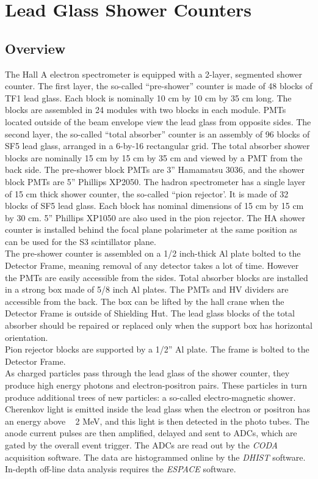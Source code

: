 \documentclass[12pt]{article}
\begin{document}
\section{Lead Glass Shower Counters}

\subsection{Overview}

 The Hall A electron spectrometer is equipped with a 2-layer,
segmented shower counter.  The first layer, the so-called
``pre-shower'' counter is made of 48 blocks of TF1 lead glass. Each
block is nominally 10 cm by 10 cm by 35 cm long. The blocks are
assembled in 24 modules with two blocks in each module. PMTs located
outside of the beam envelope view the lead glass from opposite
sides. The second layer, the so-called ``total absorber'' counter is
an assembly of 96 blocks of SF5 lead glass, arranged in a 6-by-16
rectangular grid.  The total absorber shower blocks are nominally 15
cm by 15 cm by 35 cm and viewed by a PMT from the back side.  The
pre-shower block PMTs are 3'' Hamamatsu 3036, and the shower block
PMTs are 5'' Phillips XP2050. The hadron spectrometer has a single
layer of 15 cm thick shower counter, the so-called ``pion
rejector'. It is made of 32 blocks of SF5 lead glass. Each block has
nominal dimensions of 15 cm by 15 cm by 30 cm. 5'' Phillips XP1050 are
also used in the pion rejector. The HA shower counter is installed
behind the focal plane polarimeter at the same position as can be used
for the S3 scintillator plane. \\


The pre-shower counter is assembled on a 1/2 inch-thick Al plate
bolted to the Detector Frame, meaning removal of any detector takes a
lot of time. However the PMTs are easily accessible from the sides.
Total absorber blocks are installed in a strong box made of 5/8 inch
Al plates.  The PMTs and HV dividers are accessible from the back. The
box can be lifted by the hall crane when the Detector Frame is outside
of Shielding Hut. The lead glass blocks of the total absorber should
be repaired or replaced only when the support box has horizontal
orientation.\\


Pion rejector blocks are supported by a 1/2'' Al plate. The frame is
bolted to the Detector Frame.\\
 
As charged particles pass through the lead glass of the shower
counter, they produce high energy photons and electron-positron pairs.
These particles in turn produce additional trees of new particles: a
so-called electro-magnetic shower.  Cherenkov light is emitted inside
the lead glass when the electron or positron has an energy above ~ 2
MeV, and this light is then detected in the photo tubes. The anode
current pulses are then amplified, delayed and sent to ADCs, which are
gated by the overall event trigger. The ADCs are read out by the {\it
CODA} acquisition software.  The data are histogrammed online by the
{\it DHIST} software.  In-depth off-line data analysis requires the
{\it ESPACE} software.
\end{document}
